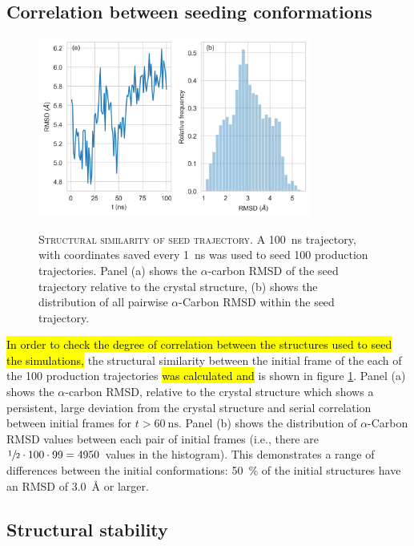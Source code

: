 \subsection{Correlation between seeding conformations}

\begin{figure}
    \centering
    \caption[Structural similarity of seed trajectory]{\textsc{Structural similarity of seed trajectory}. A \SI{100}{\nano\second} trajectory, with coordinates saved every \SI{1}{\nano\second} was used to seed \num{100} production trajectories.  Panel (a) shows the $\alpha$-carbon RMSD of the seed trajectory relative to the crystal structure, (b) shows the distribution of all pairwise $\alpha$-Carbon RMSD within the seed trajectory. }
    \includegraphics[width=0.8\textwidth]{chapters/aadh/figures/rmsd_seed_trajectory.png}
    \label{fig:rmsd_seed_traj}
\end{figure}



\hl{In order to check the degree of correlation between the structures used to seed the simulations, }the structural similarity between the initial frame of the each of the 100 production trajectories \hl{was calculated and} is shown in figure \ref{fig:rmsd_seed_traj}. Panel (a) shows the $\alpha$-carbon RMSD, relative to the crystal structure which shows a persistent, large deviation from the crystal structure and serial correlation between initial frames for $t>\SI{60}{\nano\second}$.  Panel (b) shows the distribution of $\alpha$-Carbon RMSD values between each pair of initial frames (i.e., there are $\sfrac{1}{2}\cdot 100\cdot 99 = 4950$ values in the histogram). This demonstrates a range of differences between the initial conformations: \SI{50}{\percent} of the initial structures have an RMSD of \SI{3.0}{\angstrom} or larger.  
 
\subsection{Structural stability}


